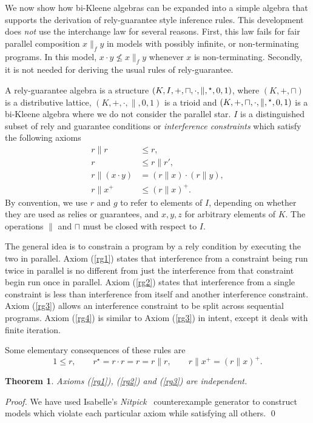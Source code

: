 \documentclass{llncs}
\newtheorem{thm}{Theorem}
\begin{document}
We now show how bi-Kleene algebras can be expanded into a
simple algebra that supports the derivation of rely-guarantee style
inference rules. This development does \emph{not} use the interchange
law for several reasons. First, this law fails for fair parallel
composition $x\parallel_f y$ in models with possibly infinite, or
non-terminating programs. In this model, $x \cdot y \not\leq x
\parallel_f y$ whenever $x$ is non-terminating. Secondly, it is not
needed for deriving the usual rules of rely-guarantee.

A rely-guarantee algebra is a structure
$(K,I,+,\sqcap,\cdot,\|,\hphantom{}^\star,0,1)$, where $(K,+,\sqcap)$
is a distributive lattice, $(K,+,\cdot,\|,0,1)$ is a trioid and
$(K,+,\sqcap,\cdot,\|,\hphantom{}^\star,0,1)$ is a bi-Kleene algebra
where we do not consider the parallel star. $I$ is a distinguished
subset of rely and guarantee conditions or \emph{interference
  constraints} which satisfy the following axioms
\begin{align}
r\|r &\le r, \label{rg1}\\
r &\le r\|r', \label{rg2}\\
r\|(x\cdot y) &= (r\|x)\cdot(r\|y), \label{rg3}\\
r\|x^+ &\le (r\|x)^+ \label{rg4}.
\end{align}
By convention, we use $r$ and $g$ to refer to elements of $I$,
depending on whether they are used as relies or guarantees, and
$x,y,z$ for arbitrary elements of $K$. The operations $\|$ and $\sqcap$
must be closed with respect to $I$.

The general idea is to constrain a program by a rely condition by
executing the two in parallel. Axiom (\ref{rg1}) states that
interference from a constraint being run twice in parallel is no
different from just the interference from that constraint begin run
once in parallel. Axiom (\ref{rg2}) states that interference from a
single constraint is less than interference from itself and another
interference constraint. Axiom (\ref{rg3}) allows an interference
constraint to be split across sequential programs. Axiom (\ref{rg4})
is similar to Axiom (\ref{rg3}) in intent, except it deals with finite
iteration.

Some elementary consequences of these rules are
\begin{equation*}
1 \le r,\qquad
r^\star = r\cdot r = r = r\|r,\qquad
r\|x^+ = (r\|x)^+.
\end{equation*}

\begin{thm}
  Axioms (\ref{rg1}), (\ref{rg2}) and (\ref{rg3}) are independent.
\end{thm}
\begin{proof}
  We have used Isabelle's
  \emph{Nitpick}~\cite{blanchette_nitpick:_2010} counterexample
  generator to construct models which violate each particular axiom
  while satisfying all others. \qed
\end{proof}
\end{document}
